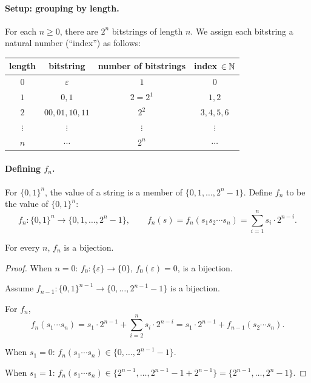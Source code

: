 \begin{solbox}[long]
\begin{solution}[(a)]

\paragraph{Setup: grouping by length.} For each $n\ge0$, there are $2^n$
bitstrings of length $n$. We assign each bitstring a natural number
(``index'') as follows:

\begin{center}
\begin{tabular}{c c c c}
\hline
length & bitstring & number of bitstrings & index $\in \mathbb{N}$ \\
\hline
$0$ & $\varepsilon$ & $1$ & $0$ \\
$1$ & $0,1$ & $2=2^1$ & $1,2$ \\
$2$ & $00,01,10,11$ & $2^2$ & $3,4,5,6$ \\
$\vdots$ & $\vdots$ & $\vdots$ & $\vdots$ \\
$n$ & $\cdots$ & $2^n$ & $\cdots$ \\
\hline
\end{tabular}
\end{center}

\paragraph{Defining $f_n$.} For $\{0,1\}^n$, the value of a string is a
member of $\{0,1,\dots,2^n-1\}$. Define $f_n$ to be the value of
$\{0,1\}^n$:
\[
    f_n : \{0,1\}^n \longrightarrow \{0,1,\dots,2^n-1\}, \qquad
    f_n(s) = f_n(s_1 s_2 \cdots s_n) = \sum_{i=1}^n s_i\cdot 2^{n-i}.
\]

\begin{claim}
    For every $n$, $f_n$ is a bijection.
\end{claim}
\begin{proof}
    When $n=0$: $f_0:\{\varepsilon\}\to\{0\}$, $f_0(\varepsilon)=0$, is a
    bijection.

    Assume $f_{n-1}:\{0,1\}^{n-1}\to\{0,\dots,2^{n-1}-1\}$ is a bijection.

    For $f_n$,
    \[
        f_n(s_1\cdots s_n) = s_1\cdot 2^{n-1} + \sum_{i=2}^n s_i\cdot 2^{n-i}
        = s_1\cdot 2^{n-1} + f_{n-1}(s_2\cdots s_n).
    \]

    When $s_1=0$: $f_n(s_1\cdots s_n)\in\{0,\dots,2^{n-1}-1\}$.

    When $s_1=1$: $f_n(s_1\cdots s_n) \in \{2^{n-1},\dots,2^{n-1}-1+2^{n-1}\}
    = \{2^{n-1},\dots,2^n-1\}$.


\end{proof}
\end{solution}
\end{solbox}
